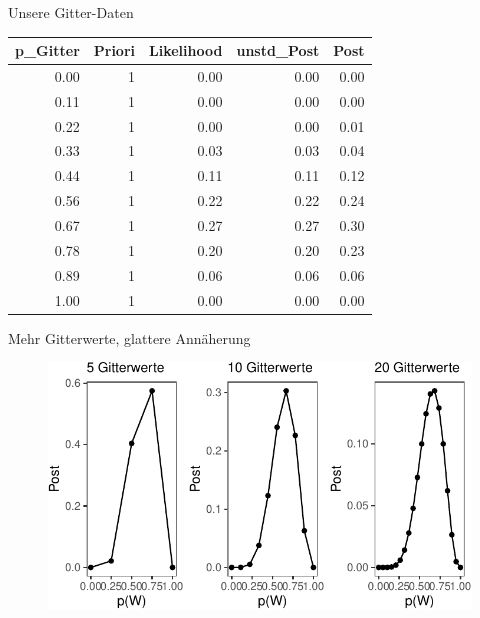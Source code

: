 \documentclass[
  ngerman,
  ignorenonframetext,
]{beamer}
\begin{document}
\begin{frame}{Unsere Gitter-Daten}
\protect\hypertarget{unsere-gitter-daten}{}
\begin{tabular}[t]{r|r|r|r|r}
\hline
p\_Gitter & Priori & Likelihood & unstd\_Post & Post\\
\hline
0.00 & 1 & 0.00 & 0.00 & 0.00\\
\hline
0.11 & 1 & 0.00 & 0.00 & 0.00\\
\hline
0.22 & 1 & 0.00 & 0.00 & 0.01\\
\hline
0.33 & 1 & 0.03 & 0.03 & 0.04\\
\hline
0.44 & 1 & 0.11 & 0.11 & 0.12\\
\hline
0.56 & 1 & 0.22 & 0.22 & 0.24\\
\hline
0.67 & 1 & 0.27 & 0.27 & 0.30\\
\hline
0.78 & 1 & 0.20 & 0.20 & 0.23\\
\hline
0.89 & 1 & 0.06 & 0.06 & 0.06\\
\hline
1.00 & 1 & 0.00 & 0.00 & 0.00\\
\hline
\end{tabular}
\end{frame}

\begin{frame}{Mehr Gitterwerte, glattere Annäherung}
\protect\hypertarget{mehr-gitterwerte-glattere-annuxe4herung}{}
\begin{figure}[H]
\includegraphics[width=1\linewidth]{unnamed-chunk-27-1} \end{figure}
\end{frame}
\end{document}
